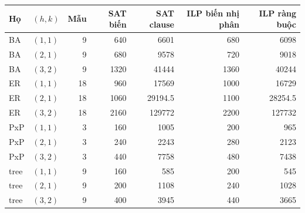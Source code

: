 \begin{tabular}{llrrrrr}
\toprule
Họ & $(h,k)$ & Mẫu & SAT biến & SAT clause & ILP biến nhị phân & ILP ràng buộc\\
\midrule
BA & $(1,1)$ & 9 & 640 & 6601 & 680 & 6098\\
BA & $(2,1)$ & 9 & 680 & 9578 & 720 & 9018\\
BA & $(3,2)$ & 9 & 1320 & 41444 & 1360 & 40244\\
ER & $(1,1)$ & 18 & 960 & 17569 & 1000 & 16729\\
ER & $(2,1)$ & 18 & 1060 & 29194.5 & 1100 & 28254.5\\
ER & $(3,2)$ & 18 & 2160 & 129772 & 2200 & 127732\\
PxP & $(1,1)$ & 3 & 160 & 1005 & 200 & 965\\
PxP & $(2,1)$ & 3 & 240 & 2243 & 280 & 2123\\
PxP & $(3,2)$ & 3 & 440 & 7758 & 480 & 7438\\
tree & $(1,1)$ & 9 & 160 & 585 & 200 & 545\\
tree & $(2,1)$ & 9 & 200 & 1108 & 240 & 1028\\
tree & $(3,2)$ & 9 & 400 & 3945 & 440 & 3665\\
\bottomrule
\end{tabular}
